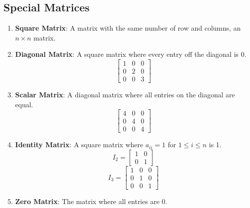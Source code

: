 \documentclass{math}
\begin{document}
\subsection*{Special Matrices}
\begin{enumerate}
  \item \textbf{Square Matrix}: A matrix with the same number of row and
    columns, an \( n \times n \) matrix.
  \item \textbf{Diagonal Matrix}: A square matrix where every entry off the
    diagonal is 0.
    \[ \begin{bmatrix}1 & 0 & 0 \\ 0 & 2 & 0 \\ 0 & 0 & 3\end{bmatrix} \]
  \item \textbf{Scalar Matrix}: A diagonal matrix where all entries on the
    diagonal are equal.
    \[ \begin{bmatrix}4 & 0 & 0 \\ 0 & 4 & 0 \\ 0 & 0 & 4\end{bmatrix} \]
  \item \textbf{Identity Matrix}: A square matrix where \( a_{ii} = 1 \) for
    \( 1\le i\le n \) is 1.
    \[ I_2 = \begin{bmatrix}1 & 0 \\ 0 & 1\end{bmatrix} \]
    \[ I_3 = \begin{bmatrix}1 & 0 & 0 \\ 0 & 1 & 0 \\ 0 & 0 & 1\end{bmatrix} \]
  \item \textbf{Zero Matrix}: The matrix where all entries are 0.
\end{enumerate}
\end{document}
